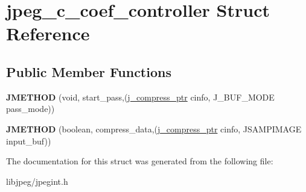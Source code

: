 \hypertarget{structjpeg__c__coef__controller}{\section{jpeg\-\_\-c\-\_\-coef\-\_\-controller Struct Reference}
\label{structjpeg__c__coef__controller}
}
\subsection*{Public Member Functions}
\begin{DoxyCompactItemize}
\item 
\hypertarget{structjpeg__c__coef__controller_a975b8ac2bcd4ea8065eb676ea805d78e}{{\bfseries J\-M\-E\-T\-H\-O\-D} (void, start\-\_\-pass,(\hyperlink{structjpeg__compress__struct}{j\-\_\-compress\-\_\-ptr} cinfo, J\-\_\-\-B\-U\-F\-\_\-\-M\-O\-D\-E pass\-\_\-mode))}\label{structjpeg__c__coef__controller_a975b8ac2bcd4ea8065eb676ea805d78e}

\item 
\hypertarget{structjpeg__c__coef__controller_a1aaf8a93ba0bd239b36f4d48657c88ee}{{\bfseries J\-M\-E\-T\-H\-O\-D} (boolean, compress\-\_\-data,(\hyperlink{structjpeg__compress__struct}{j\-\_\-compress\-\_\-ptr} cinfo, J\-S\-A\-M\-P\-I\-M\-A\-G\-E input\-\_\-buf))}\label{structjpeg__c__coef__controller_a1aaf8a93ba0bd239b36f4d48657c88ee}

\end{DoxyCompactItemize}


The documentation for this struct was generated from the following file\-:\begin{DoxyCompactItemize}
\item 
libjpeg/jpegint.\-h\end{DoxyCompactItemize}
